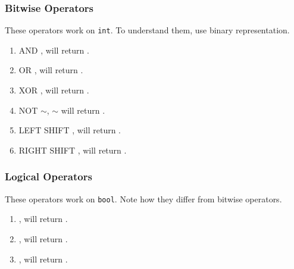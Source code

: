 \documentclass{beamer}
\begin{document}
\begin{frame}[fragile]
\frametitle{Bitwise Operators}
These operators work on \lstinline{int}. To understand them, use binary representation.
\begin{enumerate}
\item AND \pyth{&},  will return .
\item OR \pyth{|},  will return .
\item XOR \pyth{^},  will return .
\item NOT $\sim$, $\sim$ will return .
\item LEFT SHIFT \pyth{<<},  will return .
\item RIGHT SHIFT \pyth{>>},  will return .
\end{enumerate}
\end{frame}

\begin{frame}[fragile]
\frametitle{Logical Operators}
These operators work on \lstinline{bool}. Note how they differ from bitwise operators.
\begin{enumerate}
\item {},  will return .
\item {},  will return .
\item {},  will return .
\end{enumerate}
\end{frame}

\end{document}
